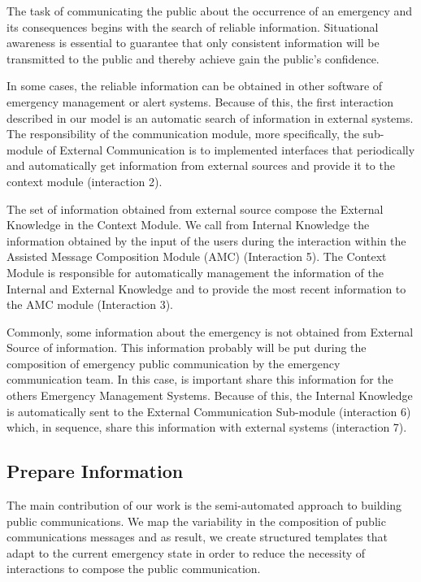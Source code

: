 The task of communicating the public about the occurrence of an emergency and its consequences begins with the search of reliable information. Situational awareness is essential to guarantee that only consistent information will be transmitted to the public and thereby achieve gain the public's confidence. 

In some cases, the reliable information can be obtained in other software of emergency management or alert systems. Because of this, the first interaction described in our model is an automatic search of information in external systems. The responsibility of the communication module, more specifically, the sub-module of External Communication is to implemented interfaces that periodically and automatically get information from external sources and provide it to the context module (interaction 2). 

The set of information obtained from external source compose the External Knowledge in the Context Module. We call from Internal Knowledge the information obtained by the input of the users during the interaction within the Assisted Message Composition Module (AMC) (Interaction 5). The Context Module is responsible for automatically management the information of the Internal and External Knowledge and to provide the most recent information to the AMC module (Interaction 3).

Commonly, some information about the emergency is not obtained from External Source of information. This information probably will be put during the composition of emergency public communication by the emergency communication team. In this case, is important share this information for the others Emergency Management Systems. Because of this, the Internal Knowledge is automatically sent to the External Communication Sub-module (interaction 6) which, in sequence, share this information with external systems (interaction 7).



\subsection{Prepare Information}

The main contribution of our work is the semi-automated approach to building public communications. We map the variability in the composition of public communications messages and as result, we create structured templates that adapt to the current emergency state in order to reduce the necessity of interactions to compose the public communication.

